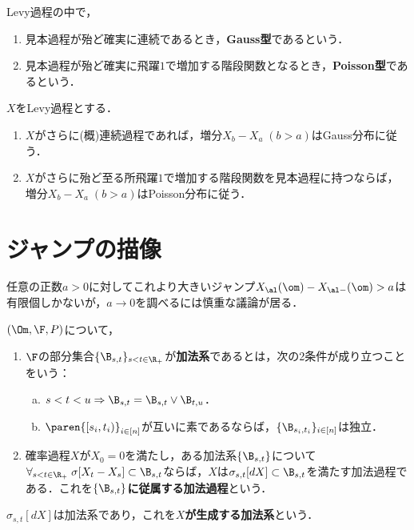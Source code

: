 \documentclass[uplatex,dvipdfmx]{jsreport}
\begin{document}
\begin{definition}
    Levy過程の中で，
    \begin{enumerate}
        \item 見本過程が殆ど確実に連続であるとき，\textbf{Gauss型}であるという．
        \item 見本過程が殆ど確実に飛躍$1$で増加する階段関数となるとき，\textbf{Poisson型}であるという．
    \end{enumerate}
\end{definition}

\begin{theorem}[Gauss型とPoisson型Levy過程]
    $X$をLevy過程とする．
    \begin{enumerate}
        \item $X$がさらに(概)連続過程であれば，増分$X_b-X_a\;(b>a)$はGauss分布に従う．
        \item $X$がさらに殆ど至る所飛躍$1$で増加する階段関数を見本過程に持つならば，増分$X_b-X_a\;(b>a)$はPoisson分布に従う．
    \end{enumerate}
\end{theorem}

\section{ジャンプの描像}

\begin{tcolorbox}[colframe=ForestGreen, colback=ForestGreen!10!white,breakable,colbacktitle=ForestGreen!40!white,coltitle=black,fonttitle=\bfseries\sffamily,
title=]
    任意の正数$a>0$に対してこれより大きいジャンプ$X_\al(\om)-X_{\al-}(\om)>a$は有限個しかないが，$a\to0$を調べるには慎重な議論が居る．
\end{tcolorbox}

\begin{definition}
    $(\Om,\F,P)$について，
    \begin{enumerate}
        \item $\F$の部分集合$\{\B_{s,t}\}_{s<t\in\R_+}$が\textbf{加法系}であるとは，次の2条件が成り立つことをいう：
        \begin{enumerate}[(a)]
            \item $s<t<u\Rightarrow\B_{s,t}=\B_{s,t}\lor\B_{t,u}$．
            \item $\paren{[s_i,t_i)}_{i\in[n]}$が互いに素であるならば，$\{\B_{s_i,t_i}\}_{i\in[n]}$は独立．
        \end{enumerate}
        \item 確率過程$X$が$X_0=0$を満たし，ある加法系$\{\B_{s,t}\}$について$\forall_{s<t\in\R_+}\;\sigma[X_t-X_s]\subset\B_{s,t}$ならば，$X$は$\sigma_{s,t}[dX]\subset\B_{s,t}$を満たす加法過程である．これを\textbf{$\{\B_{s,t}\}$に従属する加法過程}という．
    \end{enumerate}
\end{definition}
\begin{example}
    $\sigma_{s,t}[dX]$は加法系であり，これを\textbf{$X$が生成する加法系}という．
\end{example}
\end{document}
